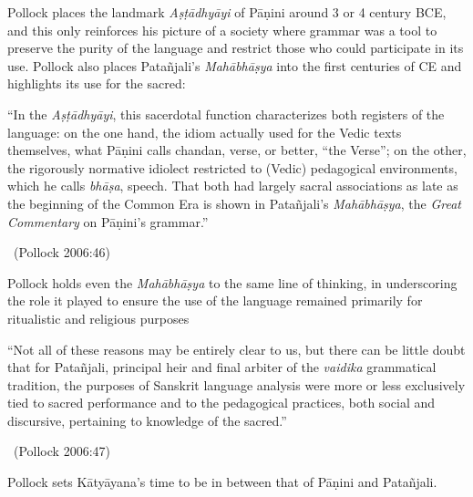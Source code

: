\vspace{-.2cm}

Pollock places the landmark \textit{Aṣṭādhyāyi} of Pāṇini around 3 or 4 century BCE, and this only reinforces his picture of a society where grammar was a tool to preserve the purity of the language and restrict those who could participate in its use. Pollock also places Patañjali’s \textit{Mahābhāṣya} into the first centuries of CE and highlights its use for the sacred:

\begin{myquote}
“In the \textit{Aṣṭādhyāyi}, this sacerdotal function characterizes both registers of the language: on the one hand, the idiom actually used for the Vedic texts themselves, what Pāṇini calls chandan, verse, or better, “the Verse”; on the other, the rigorously normative idiolect restricted to (Vedic) pedagogical environments, which he calls \textit{bhāṣa}, speech. That both had largely sacral associations as late as the beginning of the Common Era is shown in Patañjali’s \textit{Mahābhāṣya}, the \textit{Great Commentary} on Pāṇini’s grammar.” 

~\hfill (Pollock 2006:46)
\end{myquote}

Pollock holds even the \textit{Mahābhāṣya} to the same line of thinking, in underscoring the role it played to ensure the use of the language remained primarily for ritualistic and religious purposes

\begin{myquote}
“Not all of these reasons may be entirely clear to us, but there can be little doubt that for Patañjali, principal heir and final arbiter of the \textit{vaidika} grammatical tradition, the purposes of Sanskrit language analysis were more or less exclusively tied to sacred performance and to the pedagogical practices, both social and discursive, pertaining to knowledge of the sacred.” 

~\hfill (Pollock 2006:47)
\end{myquote}

Pollock sets Kātyāyana’s time to be in between that of Pāṇini and Patañjali.

